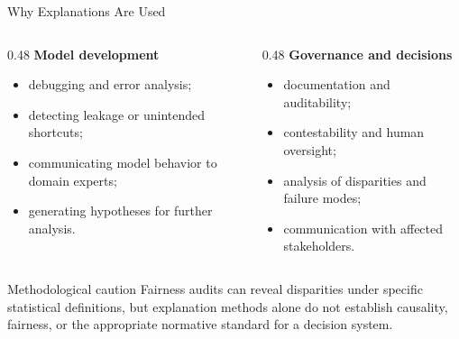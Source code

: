 \begin{frame}{Why Explanations Are Used}
\begin{columns}
\begin{column}{0.48\textwidth}
\textbf{Model development}
\begin{itemize}
  \item debugging and error analysis;
  \item detecting leakage or unintended shortcuts;
  \item communicating model behavior to domain experts;
  \item generating hypotheses for further analysis.
\end{itemize}
\end{column}

\begin{column}{0.48\textwidth}
\textbf{Governance and decisions}
\begin{itemize}
  \item documentation and auditability;
  \item contestability and human oversight;
  \item analysis of disparities and failure modes;
  \item communication with affected stakeholders.
\end{itemize}
\end{column}
\end{columns}

\begin{alertblock}{Methodological caution}
Fairness audits can reveal disparities under specific statistical definitions, but explanation methods alone do not establish causality, fairness, or the appropriate normative standard for a decision system.
\end{alertblock}
\end{frame}

